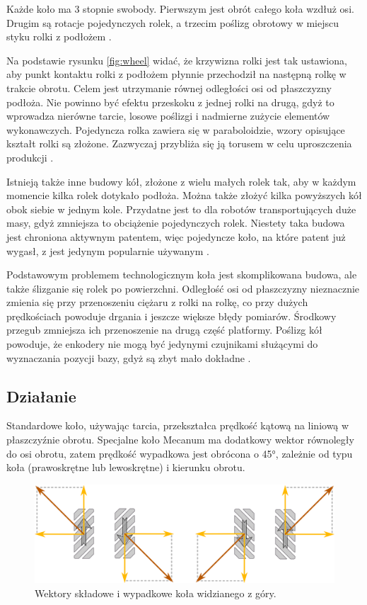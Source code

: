 	Każde koło ma 3 stopnie swobody. Pierwszym jest obrót całego koła wzdłuż osi.
	Drugim są rotacje pojedynczych rolek, a trzecim poślizg obrotowy w miejscu styku rolki z podłożem \cite{kinematic_modeling}.

	Na podstawie rysunku \ref{fig:wheel} widać, że krzywizna rolki jest tak ustawiona, aby punkt kontaktu rolki z podłożem płynnie przechodził na następną rolkę w trakcie obrotu.
	Celem jest utrzymanie równej odległości osi od płaszczyzny podłoża.
	Nie powinno być efektu przeskoku z jednej rolki na drugą, gdyż to wprowadza nierówne tarcie, losowe poślizgi i nadmierne zużycie elementów wykonawczych.
	Pojedyncza rolka zawiera się w paraboloidzie, wzory opisujące kształt rolki są złożone.
	Zazwyczaj przybliża się ją torusem w celu uproszczenia produkcji \cite{rollers}.

	Istnieją także inne budowy kół, złożone z wielu małych rolek tak, aby w każdym momencie kilka rolek dotykało podłoża.
	Można także złożyć kilka powyższych kół obok siebie w jednym kole.
	Przydatne jest to dla robotów transportujących duże masy, gdyż zmniejsza to obciążenie pojedynczych rolek.
	Niestety taka budowa jest chroniona aktywnym patentem, więc pojedyncze koło, na które patent już wygasł, z jest jedynym popularnie używanym \cite{paletobot}.

	Podstawowym problemem technologicznym koła jest skomplikowana budowa, ale także ślizganie się rolek po powierzchni.
	Odległość osi od płaszczyzny nieznacznie zmienia się przy przenoszeniu ciężaru z rolki na rolkę, co przy dużych prędkościach powoduje drgania i jeszcze większe błędy pomiarów.
	Środkowy przegub zmniejsza ich przenoszenie na drugą część platformy.
	Poślizg kół powoduje, że enkodery nie mogą być jedynymi czujnikami służącymi do wyznaczania pozycji bazy, gdyż są zbyt mało dokładne \cite{heavy}.

	\subsection{Działanie}
	Standardowe koło, używając tarcia, przekształca prędkość kątową na liniową w płaszczyźnie obrotu. 
	Specjalne koło Mecanum ma dodatkowy wektor równoległy do osi obrotu, zatem prędkość wypadkowa jest obrócona o 45°, zależnie od typu koła (prawoskrętne lub lewoskrętne) i 
	kierunku obrotu.

	\begin{figure}[H]
	\centering
	\includegraphics[width=\textwidth]{graphics/vectors.pdf}
	\caption{Wektory składowe i wypadkowe koła widzianego z góry.}
	\label{fig:wheel_vectors}
	\end{figure} 

